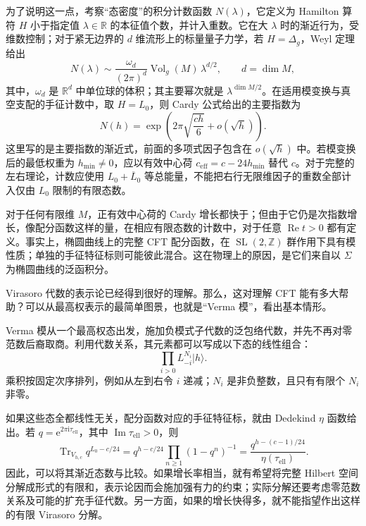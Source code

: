 为了说明这一点，考察“态密度”的积分计数函数 $N(\lambda)$，它定义为 Hamilton 算符 $H$ 小于指定值 $\lambda\in\mathbb{R}$ 的本征值个数，并计入重数。它在大 $\lambda$ 时的渐近行为，受维数控制；对于紧无边界的 $d$ 维流形上的标量量子力学，若 $H=\Delta_g$，Weyl 定理给出
\begin{equation}\label{eq:3.34}
N(\lambda)\sim
\frac{\omega_d}{(2\pi)^d}\operatorname{Vol}_g(M)\,
\lambda^{d/2},\qquad d=\dim M,
\end{equation}
其中，$\omega_d$ 是 $\mathbb{R}^d$ 中单位球的体积；其主要幂次就是 $\lambda^{\dim M/2}$。在适用模变换与真空支配的手征计数中，取 $H=L_0$，则 Cardy 公式给出的主要指数为
\begin{equation}\label{eq:3.35}
N(h)=\exp\left(2\pi\sqrt{\frac{ch}{6}}+o(\sqrt h)\right).
\end{equation}
这里写的是主要指数的渐近式，前面的多项式因子包含在 $o(\sqrt h)$ 中。若模变换后的最低权重为 $h_{\min}\ne0$，应以有效中心荷 $c_{\mathrm{eff}}=c-24h_{\min}$ 替代 $c$。对于完整的左右理论，计数应使用 $L_0+\overline L_0$ 等总能量，不能把右行无限维因子的重数全部计入仅由 $L_0$ 限制的有限态数。

对于任何有限维 $M$，正有效中心荷的 Cardy 增长都快于；但由于它仍是次指数增长，像配分函数这样的量，在相应有限态数的计数中，对于任意 $\operatorname{Re}t>0$ 都有定义。事实上，椭圆曲线上的完整 CFT 配分函数，在 $\operatorname{SL}(2,\mathbb{Z})$ 群作用下具有模性质；单独的手征特征标则可能彼此混合。这在物理上的原因，是它们来自以 $\Sigma$ 为椭圆曲线的泛函积分。

Virasoro 代数的表示论已经得到很好的理解。那么，这对理解 CFT 能有多大帮助？可以从最高权表示的最简单图景，也就是“Verma 模”，看出基本情形。
\begin{definition*}\label{def:3.verma-module}
Verma 模从一个最高权态出发，施加负模式子代数的泛包络代数，并先不再对零范数后裔取商。利用代数关系，其元素都可以写成以下态的线性组合：
\begin{equation}\label{eq:3.36}
\prod_{i>0}L_{-i}^{N_i}|h\rangle.
\end{equation}
乘积按固定次序排列，例如从左到右令 $i$ 递减；$N_i$ 是非负整数，且只有有限个 $N_i$ 非零。
\end{definition*}

如果这些态全都线性无关，配分函数对应的手征特征标，就由 Dedekind $\eta$ 函数给出。若 $q=\mathrm{e}^{2\pi\mathrm{i}\tau_{\mathrm{ell}}}$，其中 $\operatorname{Im}\tau_{\mathrm{ell}}>0$，则
\[
\operatorname{Tr}_{V_{h,c}}q^{L_0-c/24}
=q^{h-c/24}\prod_{n\ge1}(1-q^n)^{-1}
=\frac{q^{h-(c-1)/24}}{\eta(\tau_{\mathrm{ell}})}.
\]
因此，可以将其渐近态数与比较。如果增长率相当，就有希望将完整 Hilbert 空间分解成形式的有限和，表示论因而会施加强有力的约束；实际分解还要考虑零范数关系及可能的扩充手征代数。另一方面，如果的增长快得多，就不能指望作出这样的有限 Virasoro 分解。

